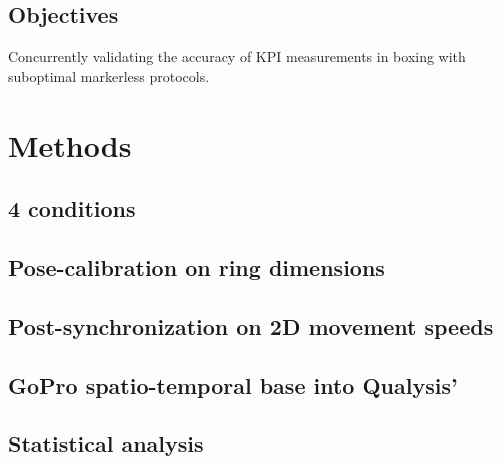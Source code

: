 

\subsection{Objectives}

Concurrently validating the accuracy of KPI measurements in boxing with suboptimal markerless protocols.


\section{Methods}
\subsection{4 conditions}
\blindtext

\subsection{Pose-calibration on ring dimensions}
\blindtext

\subsection{Post-synchronization on 2D movement speeds}
\blindtext

\subsection{GoPro spatio-temporal base into Qualysis'}
\blindtext

\subsection{Statistical analysis}
\blindtext


